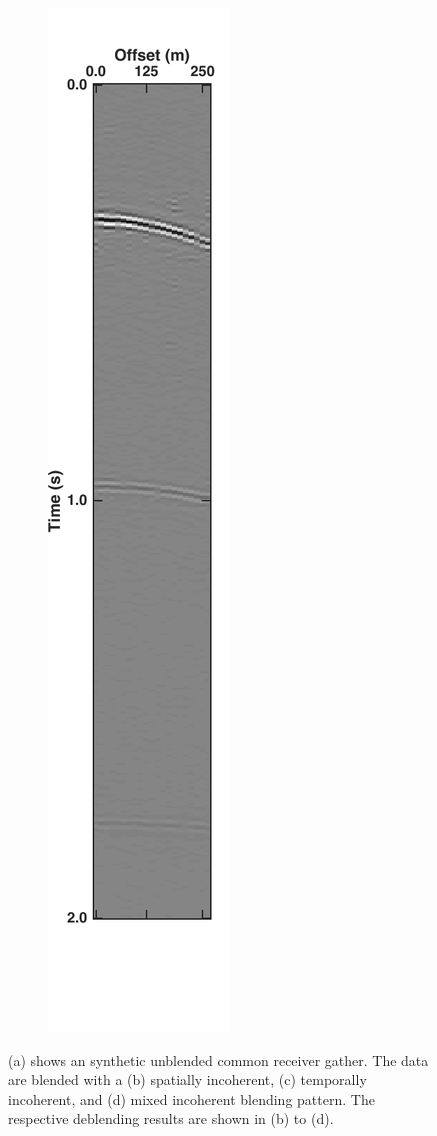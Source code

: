 \begin{figure}
\begin{subfigure}[t]{0.24\textwidth}
		\caption{}
		\label{fig:Ch-Results-Debl-inline10-t}
	\end{subfigure}
	\centering
	\begin{subfigure}[t]{0.24\textwidth}
		\centering
		\includegraphics[height = 0.38\textheight]{Plots/BlendingPatterns/Deblended_xline10xt}
		\caption{}
		\label{fig:Ch-Results-Debl-inline10-xt}
	\end{subfigure}
	
	\caption{(a) shows an synthetic unblended common receiver gather. The data are blended with a (b) spatially incoherent, (c) temporally incoherent, and (d) mixed incoherent blending pattern. The respective deblending results are shown in (b) to (d).}
	\label{fig:Ch-Results-Debl-x-inline}

\end{figure}



